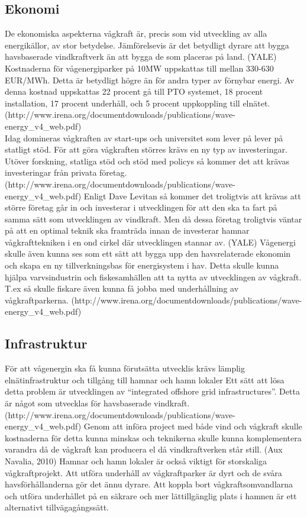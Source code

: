 \documentclass[10pt,a4paper,oneside]{article}
\begin{document}
\subsection{Ekonomi}
De ekonomiska aspekterna vågkraft är, precis som vid utveckling av alla energikällor, av stor betydelse. Jämförelsevis är det betydligt dyrare att bygga havsbaserade vindkraftverk än att bygga de som placeras på land. (YALE)
Kostnaderna för vågenergiparker på 10MW uppskattas till mellan 330-630 EUR/MWh. Detta är betydligt högre än för andra typer av förnybar energi. Av denna kostnad uppskattas 22 procent gå till PTO systemet, 18 procent installation, 17 procent underhåll, och 5 procent uppkoppling till elnätet. (http://www.irena.org/documentdownloads/publications/wave-energy_v4_web.pdf)\\

Idag domineras vågkraften av start-ups och universitet som lever på lever på statligt stöd. För att göra vågkraften störres krävs en ny typ av investeringar. Utöver forskning, statliga stöd och stöd med policys så kommer det att krävas investeringar från privata företag. (http://www.irena.org/documentdownloads/publications/wave-energy_v4_web.pdf) Enligt Dave Levitan så kommer det troligtvis att krävas att större företag går in och investerar i utvecklingen för att den ska ta fart på samma sätt som utvecklingen av vindkraft. Men då dessa företag troligtvis väntar på att en optimal teknik ska framträda innan de investerar hamnar vågkrafttekniken i en ond cirkel där utvecklingen stannar av. (YALE) Vågenergi skulle även kunna ses som ett sätt att bygga upp den havsrelaterade ekonomin och skapa en ny tillverkningsbas för energisystem i hav. Detta skulle kunna hjälpa varvsindustrin och fiskesamhällen att ta nytta av utvecklingen av vågkraft. T.ex så skulle fiskare även kunna få jobba med underhållning av vågkraftparkerna. (http://www.irena.org/documentdownloads/publications/wave-energy_v4_web.pdf)

\subsection{Infrastruktur}
För att vågenergin ska få kunna förutsätta utvecklis krävs lämplig elnätinfrastruktur och tillgång till hamnar och hamn lokaler Ett sätt att lösa detta problem är utvecklingen av “integrated offshore grid infrastructures”. Detta är något som utvecklas för havsbaserade vindkraft. (http://www.irena.org/documentdownloads/publications/wave-energy_v4_web.pdf) Genom att införa project med både vind och vågkraft skulle kostnaderna för detta kunna minskas och teknikerna skulle kunna komplementera varandra då de vågkraft kan producera el då vindkraftverken står still. (Aux Navalia, 2010) Hamnar och hamn lokaler är också viktigt för storskaliga vågkraftprojekt. Att utföra underhåll av vågkraftparker är dyrt och de svåra havsförhållanderna gör det ännu dyrare. Att koppla bort vågkraftsomvandlarna och utföra underhållet på en säkrare och mer lättillgänglig plats i hamnen är ett alternativt tillvägagångssätt. 
\end{document}
